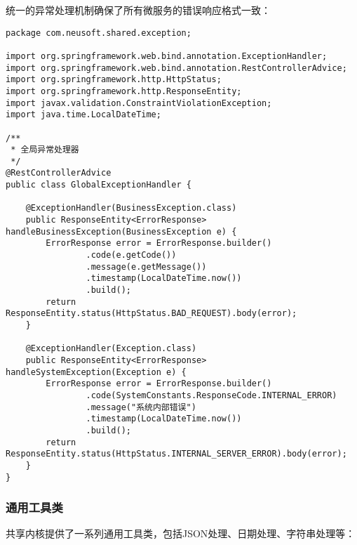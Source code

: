 \documentclass[a4paper,12pt]{article}
\begin{document}
统一的异常处理机制确保了所有微服务的错误响应格式一致：

\begin{lstlisting}[caption=全局异常处理器]
package com.neusoft.shared.exception;

import org.springframework.web.bind.annotation.ExceptionHandler;
import org.springframework.web.bind.annotation.RestControllerAdvice;
import org.springframework.http.HttpStatus;
import org.springframework.http.ResponseEntity;
import javax.validation.ConstraintViolationException;
import java.time.LocalDateTime;

/**
 * 全局异常处理器
 */
@RestControllerAdvice
public class GlobalExceptionHandler {
    
    @ExceptionHandler(BusinessException.class)
    public ResponseEntity<ErrorResponse> handleBusinessException(BusinessException e) {
        ErrorResponse error = ErrorResponse.builder()
                .code(e.getCode())
                .message(e.getMessage())
                .timestamp(LocalDateTime.now())
                .build();
        return ResponseEntity.status(HttpStatus.BAD_REQUEST).body(error);
    }
    
    @ExceptionHandler(Exception.class)
    public ResponseEntity<ErrorResponse> handleSystemException(Exception e) {
        ErrorResponse error = ErrorResponse.builder()
                .code(SystemConstants.ResponseCode.INTERNAL_ERROR)
                .message("系统内部错误")
                .timestamp(LocalDateTime.now())
                .build();
        return ResponseEntity.status(HttpStatus.INTERNAL_SERVER_ERROR).body(error);
    }
}
\end{lstlisting}

\subsubsection{通用工具类}

共享内核提供了一系列通用工具类，包括JSON处理、日期处理、字符串处理等：
\end{document}
